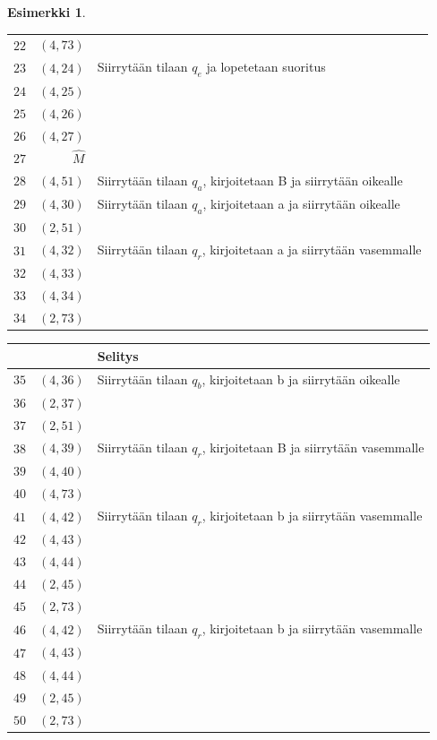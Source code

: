 \documentclass[a4paper, 12pt]{article}
\theoremstyle{definition}
\newtheorem{example}[mydef]{Esimerkki}
\theoremstyle{plain}
\begin{document}
\begin{example}
\begin{center}
\begin{tabular}[t]{r|r|l}
$\hat{22}$ & $(4, 73)$  &\\
$\hat{23}$ & $(4, 24)$  & Siirrytään tilaan $q_e$ ja lopetetaan suoritus\\
$\hat{24}$ & $(4, 25)$  &\\
$\hat{25}$ & $(4, 26)$  &\\
$\hat{26}$ & $(4, 27)$  &\\
$\hat{27}$ & $\hat{M}$  &\\
$\hat{28}$ & $(4, 51)$  & Siirrytään tilaan $q_a$, kirjoitetaan B ja siirrytään oikealle\\
$\hat{29}$ & $(4, 30)$  & Siirrytään tilaan $q_a$, kirjoitetaan a ja siirrytään oikealle\\
$\hat{30}$ & $(2, 51)$  & \\
$\hat{31}$ & $(4, 32)$  & Siirrytään tilaan $q_r$, kirjoitetaan a ja siirrytään vasemmalle\\
$\hat{32}$ & $(4, 33)$\\
$\hat{33}$ & $(4, 34)$\\
$\hat{34}$ & $(2, 73)$  & \\
\end{tabular}
\begin{tabular}[t]{r|r|l}
& & Selitys\\
\hline
$\hat{35}$ & $(4, 36)$  & Siirrytään tilaan $q_b$, kirjoitetaan b ja siirrytään oikealle\\
$\hat{36}$ & $(2, 37)$  & \\
$\hat{37}$ & $(2, 51)$  & \\
$\hat{38}$ & $(4, 39)$  & Siirrytään tilaan $q_r$, kirjoitetaan B ja siirrytään vasemmalle\\
$\hat{39}$ & $(4, 40)$  & \\
$\hat{40}$ & $(4, 73)$  & \\
$\hat{41}$ & $(4, 42)$  & Siirrytään tilaan $q_r$, kirjoitetaan b ja siirrytään vasemmalle\\
$\hat{42}$ & $(4, 43)$\\
$\hat{43}$ & $(4, 44)$\\
$\hat{44}$ & $(2, 45)$  & \\
$\hat{45}$ & $(2, 73)$  & \\
$\hat{46}$ & $(4, 42)$  & Siirrytään tilaan $q_r$, kirjoitetaan b ja siirrytään vasemmalle\\
$\hat{47}$ & $(4, 43)$\\
$\hat{48}$ & $(4, 44)$\\
$\hat{49}$ & $(2, 45)$  & \\
$\hat{50}$ & $(2, 73)$  & \\

\end{tabular}
\end{center}
\end{example}
\end{document}
